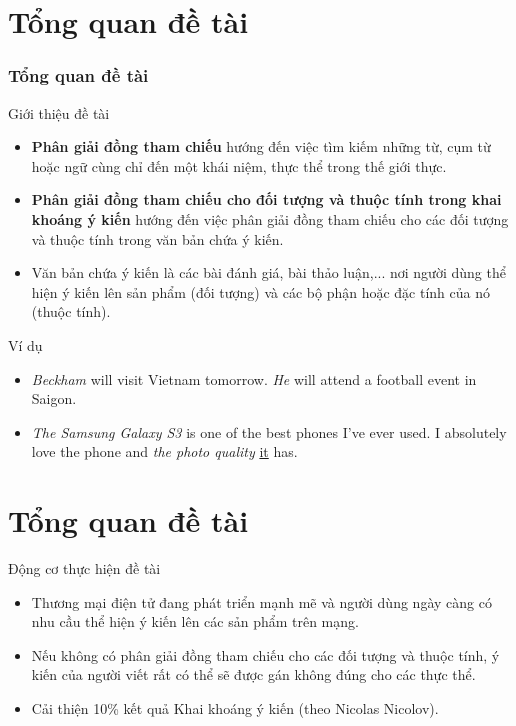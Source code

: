 \documentclass[9pt,xcolor=table,hyperref=unicode]{beamer}
\begin{document}
	\section{Tổng quan đề tài}
	\begin{frame}
		\frametitle{Tổng quan đề tài}
		\begin{block}{Giới thiệu đề tài}
			\begin{itemize}
				\item{\textbf{Phân giải đồng tham chiếu} hướng đến việc tìm kiếm những từ, cụm từ hoặc ngữ cùng chỉ đến một khái niệm, thực thể trong thế giới thực.}
				\item{\textbf{Phân giải đồng tham chiếu cho đối tượng và thuộc tính trong khai khoáng ý kiến} hướng đến việc phân giải đồng tham chiếu cho các đối tượng và thuộc tính trong văn bản chứa ý kiến.}
				\item{Văn bản chứa ý kiến là các bài đánh giá, bài thảo luận,... nơi người dùng thể hiện ý kiến lên sản phẩm (đối tượng) và các bộ phận hoặc đặc tính của nó (thuộc tính).}
			\end{itemize}
		\end{block}		
		\begin{block}{Ví dụ}
			\begin{itemize}
				\item{\textit{Beckham} will visit Vietnam tomorrow. \textit{He} will attend a football event in Saigon.}
				\item{\textit{The Samsung Galaxy S3} is one of the best phones I’ve ever used. I absolutely
					love the phone and \textit{the photo quality} \underline{it} has.}
			\end{itemize}
		\end{block}			
	\end{frame}


	\section{Tổng quan đề tài}
	\begin{frame}
		\begin{block}{Động cơ thực hiện đề tài}
			\begin{itemize}	
				\item{Thương mại điện tử đang phát triển mạnh mẽ và người dùng ngày càng có nhu cầu thể hiện ý kiến lên các sản phẩm trên mạng.}
				\item{Nếu không có phân giải đồng tham chiếu cho các đối tượng và thuộc tính, ý kiến của người viết rất có thể sẽ được gán không đúng cho các thực thể.}
				\item{Cải thiện 10\% kết quả Khai khoáng ý kiến (theo Nicolas Nicolov).}
			\end{itemize}		
		\end{block}		
	\end{frame}
\end{document}
